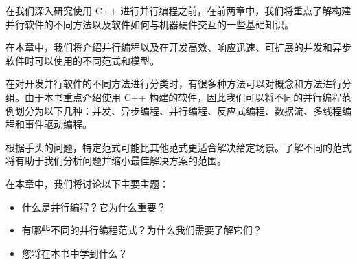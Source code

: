 在我们深入研究使用 C++ 进行并行编程之前，在前两章中，我们将重点了解构建并行软件的不同方法以及软件如何与机器硬件交互的一些基础知识。

在本章中，我们将介绍并行编程以及在开发高效、响应迅速、可扩展的并发和异步软件时可以使用的不同范式和模型。

在对开发并行软件的不同方法进行分类时，有很多种方法可以对概念和方法进行分组。由于本书重点介绍使用 C++ 构建的软件，因此我们可以将不同的并行编程范例划分为以下几种：并发、异步编程、并行编程、反应式编程、数据流、多线程编程和事件驱动编程。

根据手头的问题，特定范式可能比其他范式更适合解决给定场景。了解不同的范式将有助于我们分析问题并缩小最佳解决方案的范围。

在本章中，我们将讨论以下主要主题：

\begin{itemize}
\item
什么是并行编程？它为什么重要？

\item
有哪些不同的并行编程范式？为什么我们需要了解它们？

\item
您将在本书中学到什么？
\end{itemize}